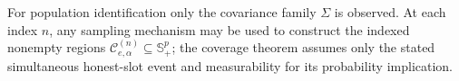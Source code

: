 For population identification only the covariance family \(\Sigma\) is observed. At each index \(n\), any sampling mechanism may be used to construct the indexed nonempty regions \(\mathcal C^{(n)}_{e,\alpha}\subseteq\mathbb S_+^p\); the coverage theorem assumes only the stated simultaneous honest-slot event and measurability for its probability implication.